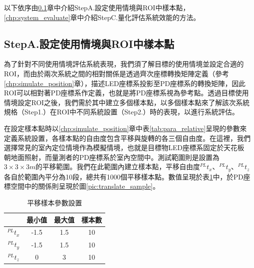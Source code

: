 以下依序由\ref{chp:scenario}章中介紹StepA.設定使用情境與ROI中樣本點，\ref{chp:system_evaluate}章中介紹StepC.量化評估系統效能的方法。







\subsection{StepA.設定使用情境與ROI中樣本點}
\label{chp:scenario}




為了針對不同使用情境評估系統表現，我們須了解目標的使用情境並設定合適的ROI，而由於兩次系統之間的相對關係是透過齊次座標轉換矩陣定義（參考\ref{chp:simulate_position}章），描述LED座標系投影至PD座標系的轉換矩陣，因此ROI可以相對著PD座標系作定義，也就是將PD座標系視為參考點。透過目標使用情境設定ROI之後，我們需於其中建立多個樣本點，以多個樣本點來了解該次系統規格（Step1.）在ROI中不同系統設置（Step2.）時的表現，以進行系統評估。

在設定樣本點時以\ref{chp:simulate_position}章中表\ref{tab:para_relative}呈現的參數來定義系統設置，各樣本點的自由度包含平移與旋轉的各三個自由度。在這裡，我們選擇常見的室內定位情境作為模擬情境，也就是目標物LED座標系固定於天花板朝地面照射，而量測者的PD座標系於室內空間中。測試範圍則是設置為$3 \times 3 \times 3 m$的平移範圍。我們在此範圍內建立樣本點，平移自由度$^{PL}t_x$、$^{PL}t_y$、$^{PL}t_z$各自於範圍內平分為10段，總共有1000個平移樣本點。數值呈現於表\ref{tab:translate}中，於PD座標空間中的關係則呈現於圖\ref{pic:translate_sample}。

\begin{table}[htpb]
    \begin{center}
      \caption{平移樣本參數設置}
      \label{tab:translate}
      \begin{tabular}{c|c|c|c} %
         & \textbf{最小值} & \textbf{最大值}&\textbf{樣本數}\\
        \hline
        $^{PL}t_x$ & -1.5 & 1.5&10\\
        $^{PL}t_y$ & -1.5 & 1.5&10\\
        $^{PL}t_z$ & 0 & 3 &10\\
      \end{tabular}
    \end{center}
  \end{table}

